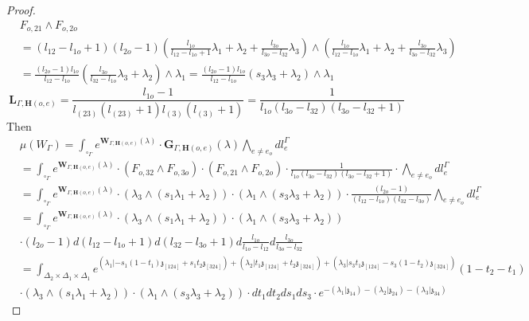 \documentclass[11pt]{amsart}
\theoremstyle{definition}
\theoremstyle{remark}
\numberwithin{equation}{section}
\begin{document}
\begin{proof}
 \begin{align*}
    & F_{o,21}\wedge F_{o,2o}  \\
    & =(l_{12}-l_{1o}+1)(l_{2o}-1)\left(\frac{l_{1o}}{l_{12}-l_{1o}+1}\lambda_1+\lambda_2+\frac{l_{3o}}{l_{3o}-l_{32}}\lambda_3\right)\wedge \left(\frac{l_{1o}}{l_{12}-l_{1o}}\lambda_1+\lambda_2+\frac{l_{3o}}{l_{3o}-l_{32}}\lambda_3\right)\\
    &=\frac{(l_{2o}-1)l_{1o}}{l_{12}-l_{1o}}\left(\frac{l_{3o}}{l_{32}-l_{1o}}\lambda_3+\lambda_2\right)\wedge\lambda_1=\frac{(l_{2o}-1)l_{1o}}{l_{12}-l_{1o}}\left(s_3\lambda_3+\lambda_2\right)\wedge\lambda_1
 \end{align*}
 $$
 \mathbf{L}_{\Gamma,\mathbf{H}(o,e)}=\frac{l_{1o}-1}{l_{(23)}(l_{(23)}+1)l_{(3)}(l_{(3)}+1)}=\frac{1}{l_{1o}(l_{3o}-l_{32})(l_{3o}-l_{32}+1)}
 $$
 Then
 \begin{align*}
    &  \mu(W_{\Gamma})=\int_{\square_{\Gamma}}e^{\mathbf{W}_{\Gamma,\mathbf{H}(o,e)}(\lambda)}\cdot \mathbf{G}_{\Gamma,\mathbf{H}(o,e)}(\lambda)\bigwedge_{e\neq e_{o}}dl^{\Gamma}_{e} \\
    & =\int_{\square_{\Gamma}}e^{\mathbf{W}_{\Gamma,\mathbf{H}(o,e)}(\lambda)}\cdot (F_{o,32}\wedge F_{o,3o} )\cdot (F_{o,21}\wedge F_{o,2o} )\cdot\frac{1}{l_{1o}(l_{3o}-l_{32})(l_{3o}-l_{32}+1)}\cdot\bigwedge_{e\neq e_{o}}dl^{\Gamma}_{e}\\
    &=\int_{\square_{\Gamma}}e^{\mathbf{W}_{\Gamma,\mathbf{H}(o,e)}(\lambda)}\cdot (\lambda_3\wedge(s_1\lambda_1+\lambda_2))\cdot (\lambda_1\wedge(s_3\lambda_3+\lambda_2))\cdot \frac{(l_{2o}-1)}{(l_{12}-l_{1o})(l_{32}-l_{3o})}  \bigwedge_{e\neq e_{o}}dl^{\Gamma}_{e}\\
    &=\int_{\square_{\Gamma}}e^{\mathbf{W}_{\Gamma,\mathbf{H}(o,e)}(\lambda)}\cdot (\lambda_3\wedge(s_1\lambda_1+\lambda_2))\cdot (\lambda_1\wedge(s_3\lambda_3+\lambda_2))\\
    &\cdot (l_{2o}-1)d(l_{12}-l_{1o}+1)d(l_{32}-l_{3o}+1)d\frac{l_{1o}}{l_{1o} -l_{12}}d\frac{l_{3o}}{l_{3o} -l_{32}}\\
    &=\int_{\Delta_2\times\Delta_1\times\Delta_1}e^{   (\lambda_1|-s_1(1-t_1)\mathfrak{z}_{[124]}+s_1t_2\mathfrak{z}_{[324]})+ (\lambda_2|t_1\mathfrak{z}_{[124]}+t_2 \mathfrak{z}_{[324]})+      (\lambda_3|s_3t_1\mathfrak{z}_{[124]}-s_3(1-t_2)\mathfrak{z}_{[324]})}(1-t_2-t_1)\\
   &\cdot(\lambda_3\wedge(s_1\lambda_1+\lambda_2))\cdot (\lambda_1\wedge(s_3\lambda_3+\lambda_2)) \cdot dt_1dt_2ds_1ds_3\cdot e^{-(\lambda_1|\mathfrak{z}_{14})-(\lambda_2|\mathfrak{z}_{24})-(\lambda_3|\mathfrak{z}_{34})}
 \end{align*}

\end{proof}
\fi
\end{document}
